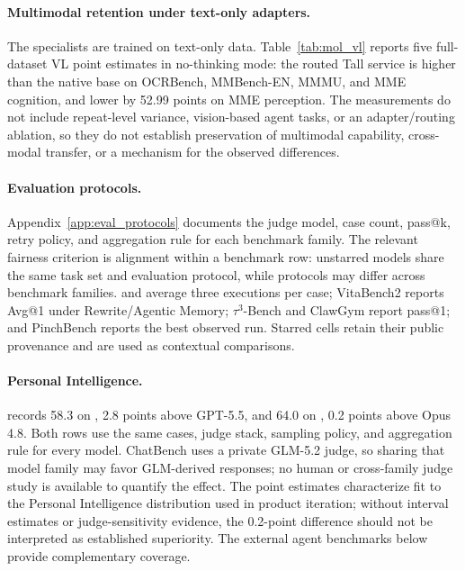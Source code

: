 \paragraph{Multimodal retention under text-only adapters.}
The \tall{} specialists are trained on text-only data. Table~\ref{tab:mol_vl} reports five full-dataset VL point estimates in no-thinking mode: the routed Tall service is higher than the native base on OCRBench, MMBench-EN, MMMU, and MME cognition, and lower by 52.99 points on MME perception. The measurements do not include repeat-level variance, vision-based agent tasks, or an adapter/routing ablation, so they do not establish preservation of multimodal capability, cross-modal transfer, or a mechanism for the observed differences.

\paragraph{Evaluation protocols.}
Appendix~\ref{app:eval_protocols} documents the judge model, case count, pass@k, retry policy, and aggregation rule for each benchmark family. The relevant fairness criterion is alignment within a benchmark row: unstarred models share the same task set and evaluation protocol, while protocols may differ across benchmark families. \chatbench{} and \livingbench{} average three executions per case; VitaBench2 reports Avg@1 under Rewrite/Agentic Memory; $\tau^3$-Bench and ClawGym report pass@1; and PinchBench reports the best observed run. Starred cells retain their public provenance and are used as contextual comparisons.

\FloatBarrier   %

\paragraph{Personal Intelligence.}
\venti{} records 58.3 on \chatbench{}, 2.8 points above GPT-5.5, and 64.0 on \livingbench{}, 0.2 points above Opus 4.8. Both rows use the same cases, judge stack, sampling policy, and aggregation rule for every model. ChatBench uses a private GLM-5.2 judge, so sharing that model family may favor GLM-derived responses; no human or cross-family judge study is available to quantify the effect. The point estimates characterize fit to the Personal Intelligence distribution used in product iteration; without interval estimates or judge-sensitivity evidence, the 0.2-point \livingbench{} difference should not be interpreted as established superiority. The external agent benchmarks below provide complementary coverage.

